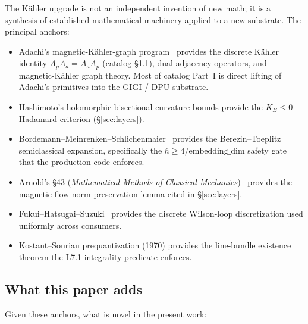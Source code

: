 \documentclass[11pt,letterpaper]{article}
\begin{document}
The K\"ahler upgrade is not an independent invention of new math; it
is a synthesis of established mathematical machinery applied to a new
substrate. The principal anchors:

\begin{itemize}[nosep]
\item Adachi's magnetic-K\"ahler-graph
  program~\cite{adachi2010hopfrinow} provides the discrete K\"ahler
  identity $A_p A_a = A_a A_p$ (catalog \S1.1), dual adjacency
  operators, and magnetic-K\"ahler graph theory. Most of catalog
  Part~I is direct lifting of Adachi's primitives into the GIGI / DPU
  substrate.
\item Hashimoto's holomorphic bisectional curvature bounds provide
  the $K_B \leq 0$ Hadamard criterion (\S\ref{sec:layers}).
\item Bordemann--Meinrenken--Schlichenmaier~\cite{bordemann1994toeplitz}
  provides the Berezin--Toeplitz semiclassical expansion,
  specifically the $\hbar \geq 4/\text{embedding\_dim}$ safety gate
  that the production code enforces.
\item Arnold's \S43 (\emph{Mathematical Methods of Classical
  Mechanics})~\cite{arnold1989mechanics} provides the magnetic-flow
  norm-preservation lemma cited in \S\ref{sec:layers}.
\item Fukui--Hatsugai--Suzuki~\cite{fhs2005chern} provides the
  discrete Wilson-loop discretization used uniformly across
  consumers.
\item Kostant--Souriau prequantization (1970) provides the
  line-bundle existence theorem the L7.1 integrality predicate
  enforces.
\end{itemize}

\subsection{What this paper adds}

Given these anchors, what is novel in the present work:
\end{document}
